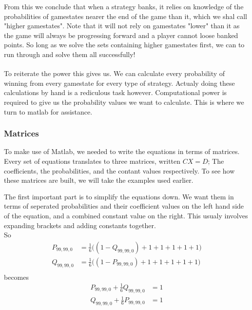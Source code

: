 \documentclass[a4paper,titlepage]{article}
\begin{document}
From this we conclude that when a strategy banks, it relies on knowledge of the probabilities of gamestates nearer the end of the game than it, which we shal call "higher gamestates".
Note that it will not rely on gamestates "lower" than it as the game will always be progressing forward and a player cannot loose banked points.
So long as we solve the sets containing higher gamestates first, we can to run through and solve them all successfully!
\\
\\
To reiterate the power this gives us. We can calculate every probability of winning from every gamestate for every type of strategy. Actualy doing these calculations by hand is a rediculous task however.
Computational power is required to give us the probability values we want to calculate. This is where we turn to matlab for assistance.

\subsubsection{Matrices}
To make use of Matlab, we needed to write the equations in terms of matrices.
Every set of equations translates to three matrices, written $CX=D$; The coefficients, the probabilities, and the contant values respectively.
To see how these matrices are built, we will take the examples used earlier.

The first important part is to simplify the equations down. We want them in terms of seperated probabilities and their coefficient values on the left hand side of the equation, and a combined constant value on the right.
This usualy involves expanding brackets and adding constants together.\\
So
\begin{align*}
	P_{99,99,0} &= \frac{1}{6}\bigg((1 - Q_{99,99,0}) + 1 + 1 + 1 + 1 + 1\bigg)\\
	Q_{99,99,0} &= \frac{1}{6}\bigg((1 - P_{99,99,0}) + 1 + 1 + 1 + 1 + 1\bigg)\\
\end{align*}
becomes
\begin{align*}
	P_{99,99,0} + \frac{1}{6}Q_{99,99,0} &= 1\\
	Q_{99,99,0} + \frac{1}{6}P_{99,99,0} &= 1
\end{align*}
\end{document}
